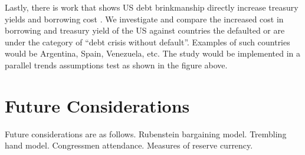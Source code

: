 \documentclass[
  12pt]{article}
\begin{document}
Lastly, there is work that shows US debt brinkmanship directly increase
treasury yields and borrowing cost \citep{nippani2017}. We investigate
and compare the increased cost in borrowing and treasury yield of the US
against countries the defaulted or are under the category of ``debt
crisis without default''. Examples of such countries would be Argentina,
Spain, Venezuela, etc. The study would be implemented in a parallel
trends assumptions test as shown in the figure above.

\hypertarget{future-considerations}{%
\section{Future Considerations}\label{future-considerations}}

Future considerations are as follows. Rubenstein bargaining model.
Trembling hand model. Congressmen attendance. Measures of reserve
currency.


\renewcommand\refname{References}
  
\end{document}
